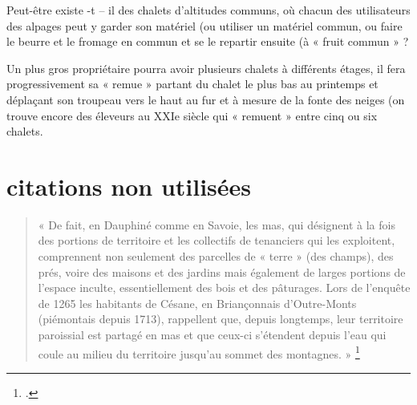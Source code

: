 \documentclass[12pt,a4paper]{report}
\begin{document}
Peut-être existe -t – il des chalets d’altitudes communs, où chacun des utilisateurs des alpages peut y garder son matériel (ou utiliser un matériel commun, ou faire le beurre et le fromage en commun et se le repartir ensuite (à « fruit commun » ?

Un plus gros propriétaire pourra avoir plusieurs chalets à différents étages, il fera progressivement sa « remue » partant du chalet le plus bas au printemps et déplaçant son troupeau vers le haut au fur et à mesure de la fonte des neiges (on trouve encore des éleveurs au XXIe siècle qui « remuent » entre cinq ou six chalets.

\section {citations non utilisées}

	\begin{quote}
		« De fait, en Dauphiné comme en Savoie, les mas, qui désignent à la fois des portions de territoire et les collectifs de tenanciers qui les exploitent, comprennent non seulement des parcelles de « terre » (des champs), des prés, voire des maisons et des jardins mais également de larges portions de l’espace inculte, essentiellement des bois et des pâturages. Lors de l’enquête de 1265 les habitants de Césane, en Briançonnais d’Outre-Monts (piémontais depuis 1713), rappellent que, depuis longtemps, leur territoire paroissial est partagé en mas et que ceux-ci s’étendent depuis l’eau qui coule au milieu du territoire jusqu’au sommet des montagnes. »
		\footcite[50]{Mouthon2019MontagnesMedievales}
	\end{quote}
	
\end{document}
